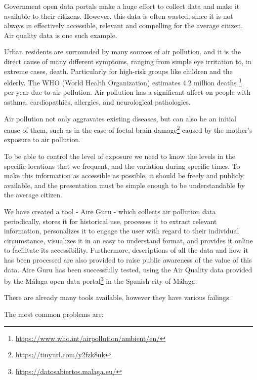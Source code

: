 Government open data portals make a huge effort to collect data and make it available to their citizens.
However, this data is often wasted, since it is not always in effectively accessible, relevant and compelling
for the average citizen. Air quality data is one such example.

Urban residents are surrounded by many sources of air pollution, and it is the direct cause of many different symptoms, ranging from simple eye irritation 
to, in extreme cases, death. Particularly for high-risk groups like children and the elderly.
The WHO (World Health Organization) estimates 4.2 million deaths
\footnote{\url{https://www.who.int/airpollution/ambient/en/}} per year due to air pollution.
Air pollution has a significant affect on people with asthma, cardiopathies, allergies, and neurological pathologies.

Air pollution not only aggravates existing diseases, but can also be an initial cause of them, such as in the case of foetal brain
damage\footnote{\url{https://tinyurl.com/y2fzk8uk}} 
caused by the mother's exposure to air pollution.

To be able to control the level of exposure we need to know the levels
in the specific locations that we frequent, and the variation during specific times.
To make this information as accessible as possible, it should be freely and publicly available, and the presentation
must be simple enough to be understandable by the average citizen.

We have created a tool - Aire Guru - which collects air pollution data periodically, stores it for historical use, 
processes it to extract relevant information, personalizes it to engage the user with regard to their individual
circumstance, visualizes it in an easy to understand format, and provides it online to facilitate its accessibility. Furthermore,
descriptions of all the data and how it has been processed are also provided to raise public awareness of the value
of this data. Aire Guru has been successfully tested, using the Air Quality data provided
by the Málaga open data portal\footnote{\url{https://datosabiertos.malaga.eu/}} in the Spanish city of Málaga.

There are already many tools available, however they have various failings.

The most common problems are:

